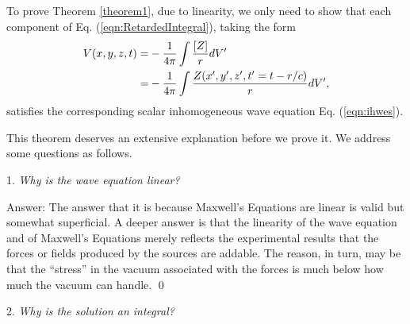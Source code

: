 \documentclass[11pt]{article}              %
\begin{document}
To prove Theorem \ref{theorem1}, due to linearity, we only need to show that each component of Eq. (\ref{eqn:RetardedIntegral}), taking the form
 \begin{align}
{V}(x,y,z,t)=&-\frac{1}{4\pi}\int \frac{[{Z}]}{r}dV^\prime\notag\\
=&-\frac{1}{4\pi}\int \frac{{Z}(x^\prime,y^\prime,z^\prime,t^\prime=t-r/c)}{r}dV^\prime,\label{eqn:RetardedIntegrals}
\end{align}
satisfies the corresponding scalar inhomogeneous wave equation Eq. (\ref{eqn:ihwes}).

This theorem deserves an extensive explanation before we prove it. We address some questions as follows.

1. {\it Why is the wave equation linear?}

Answer: The answer that it is because Maxwell's Equations are linear is valid but somewhat superficial. A deeper answer is that the linearity of the wave equation and of Maxwell's Equations merely reflects the experimental results that the forces or fields produced by the sources are addable. The reason, in turn, may be that the ``stress'' in the vacuum associated with the forces is much below how much the vacuum can handle. 
\qed

2. {\it Why is the solution an integral?} 



\end{document}
